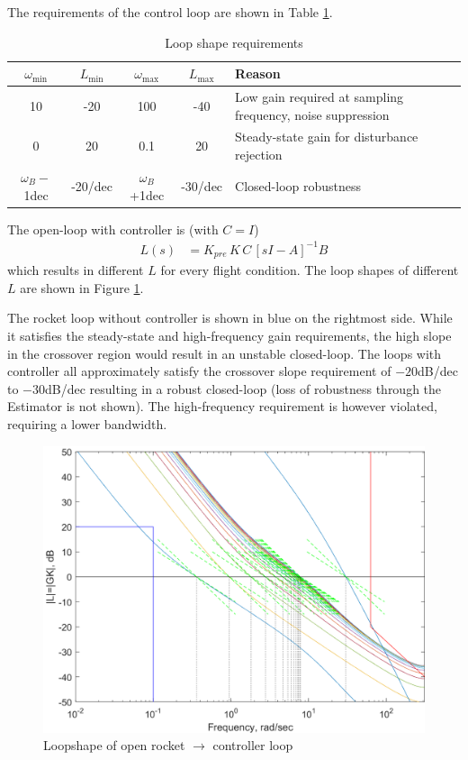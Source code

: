 The requirements of the control loop are shown in Table \ref{tab:controller_loopshape}.
\begin{table}[ht]
    \centering
    \begin{tabularx}{\linewidth}{c c | c c | X }
         $\omega_\text{min}$ & $L_\text{min}$ & $\omega_\text{max}$ & $L_\text{max}$ & Reason \\
         \hline
         10 & -20 & 100 & -40 & Low gain required at sampling frequency, noise suppression \\
         0 & 20 & 0.1 & 20 & Steady-state gain for disturbance rejection \\
         $\omega_B-$1dec & -20/dec & $\omega_B$+1dec & -30/dec & Closed-loop robustness
    \end{tabularx}
    \caption{Loop shape requirements}
    \label{tab:controller_loopshape}
\end{table}

The open-loop with controller is (with $C=I$) 
\begin{align}
    L(s) &=  K_{pre}\,  K \, C \, \left[sI- A\right]^{-1} B
\end{align}
which results in different $L$ for every flight condition.
The loop shapes of different $L$ are shown in Figure \ref{fig:controller_loopshape}.

The rocket loop without controller is shown in blue on the rightmost side. 
While it satisfies the steady-state and high-frequency gain requirements, the high slope in the crossover region would result in an unstable closed-loop.
The loops with controller all approximately satisfy the crossover slope requirement of $-20$dB/dec to $-30$dB/dec resulting in a robust closed-loop (loss of robustness through the Estimator is not shown). 
The high-frequency requirement is however violated, requiring a lower bandwidth.

\begin{figure}[ht]
    \centering
    \includegraphics[width=0.7\linewidth]{images-design/controller_loopshape.png}
    \caption{Loopshape of open rocket $\to$ controller loop}
    \label{fig:controller_loopshape}
\end{figure}




